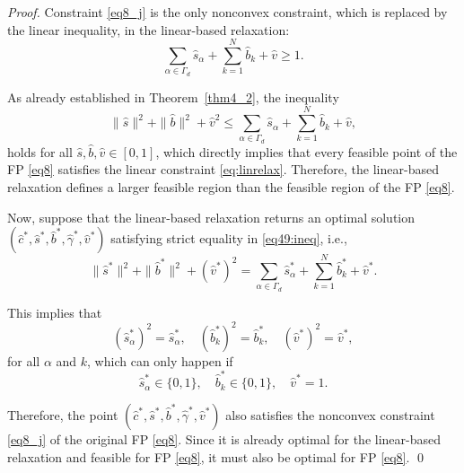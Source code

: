 \documentclass[smallextended,referee,envcountsect,,numbers]{svjour3}
\begin{document}
\begin{proof}
Constraint \eqref{eq8_j} is the only nonconvex constraint, which is replaced by the linear inequality, in the linear-based relaxation:
\begin{equation} \label{eq:linrelax}
\sum_{\alpha \in \Gamma_d} \hat{s}_\alpha + \sum_{k=1}^N \hat{b}_k + \hat{v} \ge 1.
\end{equation}

As already established in Theorem~\ref{thm4_2}, the inequality
\begin{equation} \label{eq49:ineq}
\|\hat{s}\|^2 + \|\hat{b}\|^2 + \hat{v}^2 \le \sum_{\alpha \in \Gamma_d} \hat{s}_\alpha + \sum_{k=1}^N \hat{b}_k + \hat{v},
\end{equation}
holds for all \( \hat{s}, \hat{b}, \hat{v} \in [0,1] \), which directly implies that every feasible point of the FP \eqref{eq8} satisfies the linear constraint \eqref{eq:linrelax}. Therefore, the linear-based relaxation defines a larger feasible region than the feasible region of the FP \eqref{eq8}. 

Now, suppose that the linear-based relaxation returns an optimal solution \( (\hat{c}^*, \hat{s}^*, \hat{b}^*, \hat{\gamma}^*, \hat{v}^*) \) satisfying strict equality in \eqref{eq49:ineq}, i.e.,
\begin{equation} \label{eq:equality}
\|\hat{s}^*\|^2 + \|\hat{b}^*\|^2 + (\hat{v}^*)^2 = \sum_{\alpha \in \Gamma_d} \hat{s}_\alpha^* + \sum_{k=1}^N \hat{b}_k^* + \hat{v}^*.
\end{equation}

This implies that
\begin{equation}
(\hat{s}_\alpha^*)^2 = \hat{s}_\alpha^*, \quad (\hat{b}_k^*)^2 = \hat{b}_k^*, \quad (\hat{v}^*)^2 = \hat{v}^*,
\end{equation}
for all \( \alpha\) and \( k \), which can only happen if 
\begin{equation}
\hat{s}_\alpha^* \in \{0,1\}, \quad \hat{b}_k^* \in \{0,1\}, \quad \hat{v}^* = 1.
\end{equation}

Therefore, the point \( (\hat{c}^*, \hat{s}^*, \hat{b}^*, \hat{\gamma}^*, \hat{v}^*) \) also satisfies the nonconvex constraint \eqref{eq8_j} of the original FP \eqref{eq8}. Since it is already optimal for the linear-based relaxation and feasible for FP \eqref{eq8}, it must also be optimal for FP \eqref{eq8}.
\qed
\end{proof}

\vspace{6cm}
\end{document}
